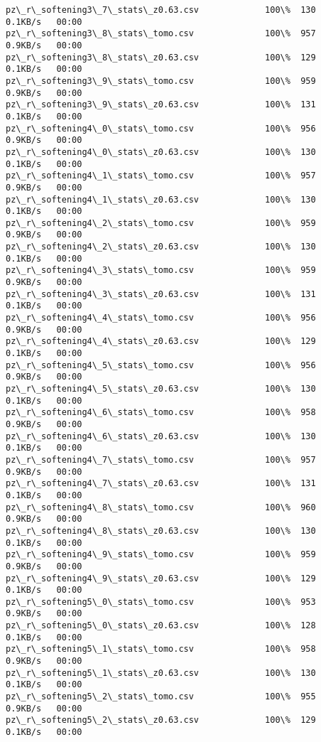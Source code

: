\documentclass[11pt]{article}
\begin{document}
\begin{Verbatim}[commandchars=\\\{\}]
pz\_r\_softening3\_7\_stats\_z0.63.csv             100\%  130     0.1KB/s   00:00    
pz\_r\_softening3\_8\_stats\_tomo.csv              100\%  957     0.9KB/s   00:00    
pz\_r\_softening3\_8\_stats\_z0.63.csv             100\%  129     0.1KB/s   00:00    
pz\_r\_softening3\_9\_stats\_tomo.csv              100\%  959     0.9KB/s   00:00    
pz\_r\_softening3\_9\_stats\_z0.63.csv             100\%  131     0.1KB/s   00:00    
pz\_r\_softening4\_0\_stats\_tomo.csv              100\%  956     0.9KB/s   00:00    
pz\_r\_softening4\_0\_stats\_z0.63.csv             100\%  130     0.1KB/s   00:00    
pz\_r\_softening4\_1\_stats\_tomo.csv              100\%  957     0.9KB/s   00:00    
pz\_r\_softening4\_1\_stats\_z0.63.csv             100\%  130     0.1KB/s   00:00    
pz\_r\_softening4\_2\_stats\_tomo.csv              100\%  959     0.9KB/s   00:00    
pz\_r\_softening4\_2\_stats\_z0.63.csv             100\%  130     0.1KB/s   00:00    
pz\_r\_softening4\_3\_stats\_tomo.csv              100\%  959     0.9KB/s   00:00    
pz\_r\_softening4\_3\_stats\_z0.63.csv             100\%  131     0.1KB/s   00:00    
pz\_r\_softening4\_4\_stats\_tomo.csv              100\%  956     0.9KB/s   00:00    
pz\_r\_softening4\_4\_stats\_z0.63.csv             100\%  129     0.1KB/s   00:00    
pz\_r\_softening4\_5\_stats\_tomo.csv              100\%  956     0.9KB/s   00:00    
pz\_r\_softening4\_5\_stats\_z0.63.csv             100\%  130     0.1KB/s   00:00    
pz\_r\_softening4\_6\_stats\_tomo.csv              100\%  958     0.9KB/s   00:00    
pz\_r\_softening4\_6\_stats\_z0.63.csv             100\%  130     0.1KB/s   00:00    
pz\_r\_softening4\_7\_stats\_tomo.csv              100\%  957     0.9KB/s   00:00    
pz\_r\_softening4\_7\_stats\_z0.63.csv             100\%  131     0.1KB/s   00:00    
pz\_r\_softening4\_8\_stats\_tomo.csv              100\%  960     0.9KB/s   00:00    
pz\_r\_softening4\_8\_stats\_z0.63.csv             100\%  130     0.1KB/s   00:00    
pz\_r\_softening4\_9\_stats\_tomo.csv              100\%  959     0.9KB/s   00:00    
pz\_r\_softening4\_9\_stats\_z0.63.csv             100\%  129     0.1KB/s   00:00    
pz\_r\_softening5\_0\_stats\_tomo.csv              100\%  953     0.9KB/s   00:00    
pz\_r\_softening5\_0\_stats\_z0.63.csv             100\%  128     0.1KB/s   00:00    
pz\_r\_softening5\_1\_stats\_tomo.csv              100\%  958     0.9KB/s   00:00    
pz\_r\_softening5\_1\_stats\_z0.63.csv             100\%  130     0.1KB/s   00:00    
pz\_r\_softening5\_2\_stats\_tomo.csv              100\%  955     0.9KB/s   00:00    
pz\_r\_softening5\_2\_stats\_z0.63.csv             100\%  129     0.1KB/s   00:00    

\end{Verbatim}
\end{document}
